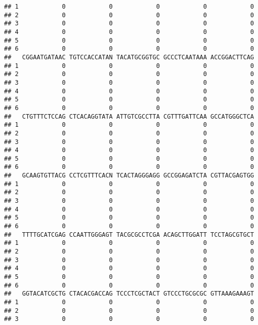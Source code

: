 \documentclass[]{article}
\begin{document}
\begin{verbatim}
## 1            0            0            0            0            0
## 2            0            0            0            0            0
## 3            0            0            0            0            0
## 4            0            0            0            0            0
## 5            0            0            0            0            0
## 6            0            0            0            0            0
##   CGGAATGATAAC TGTCCACCATAN TACATGCGGTGC GCCCTCAATAAA ACCGGACTTCAG
## 1            0            0            0            0            0
## 2            0            0            0            0            0
## 3            0            0            0            0            0
## 4            0            0            0            0            0
## 5            0            0            0            0            0
## 6            0            0            0            0            0
##   CTGTTTCTCCAG CTCACAGGTATA ATTGTCGCCTTA CGTTTGATTCAA GCCATGGGCTCA
## 1            0            0            0            0            0
## 2            0            0            0            0            0
## 3            0            0            0            0            0
## 4            0            0            0            0            0
## 5            0            0            0            0            0
## 6            0            0            0            0            0
##   GCAAGTGTTACG CCTCGTTTCACN TCACTAGGGAGG GCCGGAGATCTA CGTTACGAGTGG
## 1            0            0            0            0            0
## 2            0            0            0            0            0
## 3            0            0            0            0            0
## 4            0            0            0            0            0
## 5            0            0            0            0            0
## 6            0            0            0            0            0
##   TTTTGCATCGAG CCAATTGGGAGT TACGCGCCTCGA ACAGCTTGGATT TCCTAGCGTGCT
## 1            0            0            0            0            0
## 2            0            0            0            0            0
## 3            0            0            0            0            0
## 4            0            0            0            0            0
## 5            0            0            0            0            0
## 6            0            0            0            0            0
##   GGTACATCGCTG CTACACGACCAG TCCCTCGCTACT GTCCCTGCGCGC GTTAAAGAAAGT
## 1            0            0            0            0            0
## 2            0            0            0            0            0
## 3            0            0            0            0            0

\end{verbatim}
\end{document}
